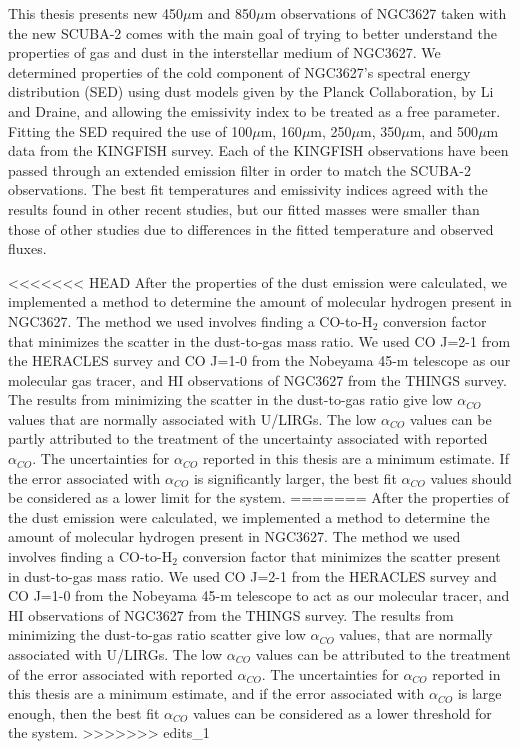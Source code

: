 This thesis presents new 450$\mu$m and 850$\mu$m observations of NGC3627 taken with the new SCUBA-2 comes with the main goal of trying to better understand the properties of gas and dust in the interstellar medium of NGC3627.  We determined properties of the cold component of NGC3627's spectral energy distribution (SED) using dust models given by the Planck Collaboration, by Li and Draine, and allowing the emissivity index to be treated as a free parameter.  Fitting the SED required the use of 100$\mu$m, 160$\mu$m, 250$\mu$m, 350$\mu$m, and 500$\mu$m data from the KINGFISH survey.  Each of the KINGFISH observations have been passed through an extended emission filter in order to match the SCUBA-2 observations.  The best fit temperatures and emissivity indices agreed with the results found in other recent studies, but our fitted masses were smaller than those of other studies due to differences in the fitted temperature and observed fluxes.

<<<<<<< HEAD
After the properties of the dust emission were calculated, we implemented a method to determine the amount of molecular hydrogen present in NGC3627.  The method we used involves finding a CO-to-H$_2$ conversion factor that minimizes the scatter in the dust-to-gas mass ratio. We used CO J=2-1 from the HERACLES survey and CO J=1-0 from the Nobeyama 45-m telescope as our molecular gas tracer, and HI observations of NGC3627 from the THINGS survey.  The results from minimizing the scatter in the dust-to-gas ratio give low $\alpha_{CO}$ values that are normally associated with U/LIRGs.  The low $\alpha_{CO}$ values can be partly attributed to the treatment of the uncertainty associated with reported $\alpha_{CO}$.  The uncertainties for $\alpha_{CO}$ reported in this thesis are a minimum estimate.  If the error associated with $\alpha_{CO}$ is significantly larger, the best fit $\alpha_{CO}$ values should be considered as a lower limit for the system.
=======
After the properties of the dust emission were calculated, we implemented a method to determine the amount of molecular hydrogen present in NGC3627.  The method we used involves finding a CO-to-H$_2$ conversion factor that minimizes the scatter present in dust-to-gas mass ratio. We used CO J=2-1 from the HERACLES survey and CO J=1-0 from the Nobeyama 45-m telescope to act as our molecular tracer, and HI observations of NGC3627 from the THINGS survey.  The results from minimizing the dust-to-gas ratio scatter give low $\alpha_{CO}$ values, that are normally associated with U/LIRGs.  The low $\alpha_{CO}$ values can be attributed to the treatment of the error associated with reported $\alpha_{CO}$.  The uncertainties for $\alpha_{CO}$ reported in this thesis are a minimum estimate, and if the error associated with $\alpha_{CO}$ is large enough, then the best fit $\alpha_{CO}$ values can be considered as a lower threshold for the system.
>>>>>>> edits_1
